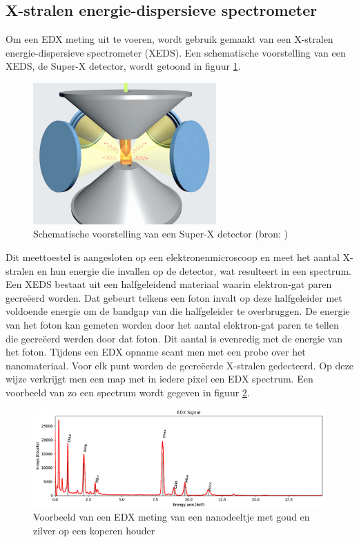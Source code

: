 \documentclass{report}
\begin{document}
\subsection{X-stralen energie-dispersieve spectrometer}
Om een EDX meting uit te voeren, wordt gebruik gemaakt van een X-stralen energie-dispersieve spectrometer (XEDS). Een schematische voorstelling van een XEDS, de Super-X detector, wordt getoond in figuur \ref{fig:tem_superx}.
\begin{figure}[h!]
	\centering
	\includegraphics[width=7cm]{images/tem/superx.png}
	\caption{Schematische voorstelling van een Super-X detector (bron: \cite{man:superx})}
	\label{fig:tem_superx}
\end{figure}
Dit meettoestel is aangesloten op een elektronenmicroscoop en meet het aantal X-stralen en hun energie die invallen op de detector, wat resulteert in een spectrum. Een XEDS bestaat uit een halfgeleidend materiaal waarin elektron-gat paren gecreëerd worden. Dat gebeurt telkens een foton invalt op deze halfgeleider met voldoende energie om de bandgap van die halfgeleider te overbruggen. De energie van het foton kan gemeten worden door het aantal elektron-gat paren te tellen die gecreëerd werden door dat foton. Dit aantal is evenredig met de energie van het foton. Tijdens een EDX opname scant men met een probe over het nanomateriaal. Voor elk punt worden de gecreëerde X-stralen gedecteerd. Op deze wijze verkrijgt men een map met in iedere pixel een EDX spectrum.  Een voorbeeld van zo een spectrum wordt gegeven in figuur \ref{fig:tem_xraylines}.
\begin{figure}[h!]
	\centering
	\includegraphics[width=15cm]{images/tem/xraylines.png}
	\caption{Voorbeeld van een EDX meting van een nanodeeltje met goud en zilver op een koperen houder}
	\label{fig:tem_xraylines}
\end{figure}
\end{document}
